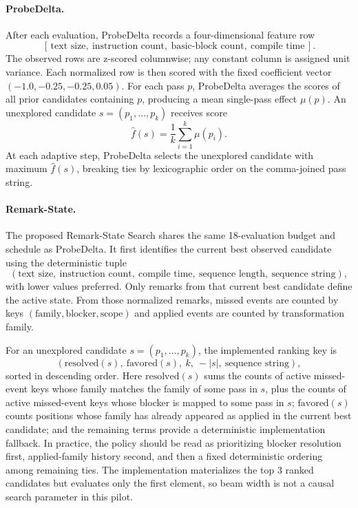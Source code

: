 \documentclass{article}
\newcommand{\method}{Remark-State Search}
\begin{document}
\paragraph{ProbeDelta.}
After each evaluation, ProbeDelta records a four-dimensional feature row
\[
[\,\text{text size},\ \text{instruction count},\ \text{basic-block count},\ \text{compile time}\,].
\]
The observed rows are z-scored columnwise; any constant column is assigned unit variance. Each normalized row is then scored with the fixed coefficient vector $(-1.0,-0.25,-0.25,0.05)$. For each pass $p$, ProbeDelta averages the scores of all prior candidates containing $p$, producing a mean single-pass effect $\mu(p)$. An unexplored candidate $s=(p_1,\dots,p_k)$ receives score
\[
\hat{f}(s)=\frac{1}{k}\sum_{i=1}^{k}\mu(p_i).
\]
At each adaptive step, ProbeDelta selects the unexplored candidate with maximum $\hat{f}(s)$, breaking ties by lexicographic order on the comma-joined pass string.

\paragraph{Remark-State.}
The proposed \method{} shares the same 18-evaluation budget and schedule as ProbeDelta. It first identifies the current best observed candidate using the deterministic tuple
\[
(\text{text size},\ \text{instruction count},\ \text{compile time},\ \text{sequence length},\ \text{sequence string}),
\]
with lower values preferred. Only remarks from that current best candidate define the active state. From those normalized remarks, missed events are counted by keys $(\text{family},\text{blocker},\text{scope})$ and applied events are counted by transformation family.

For an unexplored candidate $s=(p_1,\dots,p_k)$, the implemented ranking key is
\[
(\mathrm{resolved}(s),\ \mathrm{favored}(s),\ k,\ -|s|,\ \text{sequence string}),
\]
sorted in descending order. Here $\mathrm{resolved}(s)$ sums the counts of active missed-event keys whose family matches the family of some pass in $s$, plus the counts of active missed-event keys whose blocker is mapped to some pass in $s$; $\mathrm{favored}(s)$ counts positions whose family has already appeared as applied in the current best candidate; and the remaining terms provide a deterministic implementation fallback. In practice, the policy should be read as prioritizing blocker resolution first, applied-family history second, and then a fixed deterministic ordering among remaining ties. The implementation materializes the top 3 ranked candidates but evaluates only the first element, so beam width is not a causal search parameter in this pilot.
\end{document}

